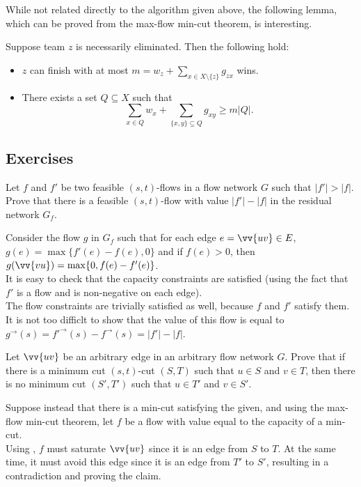		While not related directly to the algorithm given above, the following lemma, which can be proved from the max-flow min-cut theorem, is interesting.

		\begin{lemma}
			Suppose team $z$ is necessarily eliminated. Then the following hold:
			\begin{itemize}
				\item $z$ can finish with at most $m = w_z + \sum_{x\in X\setminus\{z\}} g_{zx}$ wins.
				\item There exists a set $Q\subseteq X$ such that
				\[ \sum_{x\in Q} w_x + \sum_{\{x,y\}\subseteq Q} g_{xy} \geq m|Q|. \]
			\end{itemize}
		\end{lemma}

\subsection{Exercises}

	\begin{exercise}
		Let $f$ and $f'$ be two feasible $(s,t)$-flows in a flow network $G$ such that $|f'| > |f|$. Prove that there is a feasible $(s,t)$-flow with value $|f'|-|f|$ in the residual network $G_f$.
	\end{exercise}
	\begin{solution*}
		Consider the flow $g$ in $G_f$ such that for each edge $e = \vv{uv}\in E$, $g(e) = \max\{f'(e) - f(e),0\}$ and if $f(e) > 0$, then $g(\vv{vu}) = \max\{0,f(e) - f'(e)\}$.\\
		It is easy to check that the capacity constraints are satisfied (using the fact that $f'$ is a flow and is non-negative on each edge).\\
		The flow constraints are trivially satisfied as well, because $f$ and $f'$ satisfy them.\\
		It is not too difficlt to show that the value of this flow is equal to $g^\to(s) = f'^\to(s) - f^\to(s) = |f'| - |f|$.
	\end{solution*}	

	\begin{exercise}
		Let $\vv{uv}$ be an arbitrary edge in an arbitrary flow network $G$. Prove that if there is a minimum cut $(s,t)$-cut $(S,T)$ such that $u\in S$ and $v\in T$, then there is no minimum cut $(S',T')$ such that $u\in T'$ and $v\in S'$.
	\end{exercise}
	\begin{solution*}
		Suppose instead that there is a min-cut satisfying the given, and using the max-flow min-cut theorem, let $f$ be a flow with value equal to the capacity of a min-cut.\\
		Using , $f$ must saturate $\vv{uv}$ since it is an edge from $S$ to $T$. At the same time, it must avoid this edge since it is an edge from $T'$ to $S'$, resulting in a contradiction and proving the claim.
	\end{solution*}


